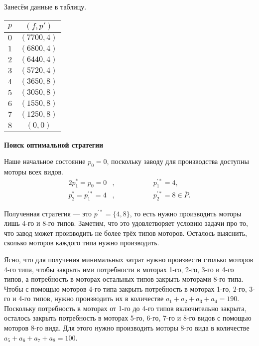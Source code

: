 \begin{enumerate}[nosep]
	Занесём данные в таблицу.
	
	\begin{table}[H]
		\centering
		\begin{tabular}{ | c | c |} 
			\hline
			$p$ & $(f, p')$ \\ 
			\hline
			$0$ & $(7700, 4)$ \\\hline
			$1$ & $(6800, 4)$ \\\hline
			$2$ & $(6440, 4)$ \\\hline
			$3$ & $(5720, 4)$ \\\hline
			$4$ & $(3650, 8)$ \\\hline
			$5$ & $(3050, 8)$ \\\hline
			$6$ & $(1550, 8)$ \\\hline
			$7$ & $(1250, 8)$ \\\hline
			$8$ & $(0, 0)$ \\\hline
		\end{tabular}
	\end{table}
\end{enumerate}

\bigskip

\textbf{Поиск оптимальной стратегии}

Наше начальное состояние $p_0 = 0$, поскольку заводу для производства доступны моторы всех видов.
\begin{alignat*}{2}
	p_1^* = p_0 = 0 &, \qquad\qquad &&p_1^{'*} = 4, \\
	p_2^* = p_1^{'*} = 4 &, &&p_2^{'*} = 8 \in \bar{P}.
\end{alignat*}

Полученная стратегия --- это $p^{'*} = \{4, 8\}$, то есть нужно производить моторы лишь 4-го и 8-го типов. Заметим, что это удовлетворяет условию задачи про то, что завод может производить не более трёх типов моторов. Осталось выяснить, сколько моторов каждого типа нужно производить.

Ясно, что для получения минимальных затрат нужно произвести столько моторов 4-го типа, чтобы закрыть ими потребности в моторах 1-го, 2-го, 3-го и 4-го типов, а потребность в моторах остальных типов закрыть моторами 8-го типа. Чтобы с помощью моторов 4-го типа закрыть потребность в моторах 1-го, 2-го, 3-го и 4-го типов, нужно производить их в количестве $a_1 + a_2 + a_3 + a_4 = 190$. Поскольку потребность в моторах от 1-го до 4-го типов включительно закрыта, осталось закрыть потребность в моторах 5-го, 6-го, 7-го и 8-го видов с помощью моторов 8-го вида. Для этого нужно производить моторы 8-го вида в количестве $a_5 + a_6 + a_7 + a_8 = 100$.

